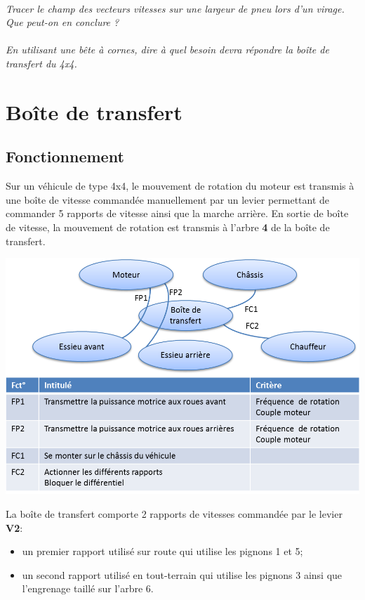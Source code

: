 \documentclass[11pt,oneside]{article}
\begin{document}
\paragraph{}
\textit{Tracer le champ des vecteurs vitesses sur une largeur de pneu lors d'un virage. Que peut-on en conclure ?}



\paragraph{}
\textit{En utilisant une bête à cornes, dire à quel besoin devra répondre la boîte de transfert du 4x4.}


\section{Boîte de transfert}

\subsection{Fonctionnement}

Sur un véhicule de type 4x4, le mouvement de rotation du moteur est transmis à une boîte de vitesse commandée manuellement par un levier permettant de commander 5 rapports de vitesse ainsi que la marche arrière. En sortie de boîte de vitesse, la mouvement de rotation est transmis à l'arbre \textbf{4} de la boîte de transfert. 

\begin{center}
\includegraphics[width=.85\textwidth]{png/af}
\end{center}

La boîte de transfert comporte 2 rapports de vitesses commandée par le levier  \textbf{V2}: 
\begin{itemize}
\item un premier rapport utilisé sur route qui utilise les pignons 1 et 5;
\item un second rapport utilisé en tout-terrain qui utilise les pignons 3 ainsi que l'engrenage taillé sur l'arbre 6.
\end{itemize}
\end{document}

